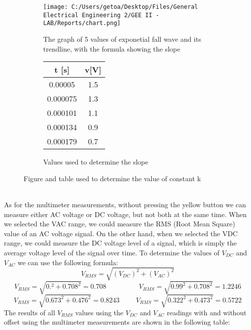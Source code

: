 \documentclass[12pt]{report}
\begin{document}
\begin{figure}[h]
    \centering
    \begin{subfigure}[b]{0.6\textwidth}
        \centering
        \texttt{[image: C:/Users/getoa/Desktop/Files/General Electrical Engineering 2/GEE II - LAB/Reports/chart.png]}
        \caption{The graph of 5 values of exponetial fall wave and its trendline, with the formula showing the slope}
        \label{fig:your_figure_label}
    \end{subfigure}%
    \hfill
    \begin{subfigure}[b]{0.3\textwidth}
        \centering
        \begin{tabular}{|c|c|}
        \hline
        \rowcolor{lightblue} \textbf{t [s]} & \textbf{v[V]} \\ \hline
        0.00005 & 1.5 \\ \hline
        0.000075 & 1.3 \\ \hline
        0.000101 & 1.1 \\ \hline
        0.000134 & 0.9 \\ \hline
        0.000179 & 0.7 \\ \hline
        \end{tabular}
        \caption{Values used to determine the slope}
        \label{tab:data}
    \end{subfigure}%
    \caption{Figure and table used to determine the value of constant k}
    \label{fig:figure_and_table}
\end{figure}
\\
As for the multimeter measurements, without pressing the yellow button we can measure either AC voltage or DC voltage, but not both at the same time. When we selected the VAC range, we could measure the RMS (Root Mean Square) value of an AC voltage signal. On the other hand, when we selected the VDC range, we could measure the DC voltage level of a signal, which is simply the average voltage level of the signal over time.
To determine the values of $ V_{DC} $ and $ V_{AC} $ we can use the following formula:
$$ V_{RMS}= \sqrt {(V_{DC})^2+(V_{AC})^2} $$
$$ V_{RMS}= \sqrt {0.^2+0.708^2} = 0.708 \hspace{2cm} V_{RMS}= \sqrt {0.99^2+0.708^2} =1.2246 $$
$$ V_{RMS}= \sqrt {0.673^2+0.476^2} = 0.8243 \hspace{1cm} V_{RMS}= \sqrt {0.322^2+0.473^2} =0.5722 $$
The results of all $V_{RMS}$ values using the $ V_{DC}$ and $V_{AC}$ readings with and without offset using the multimeter measurements are shown in the following table:
\end{document}
